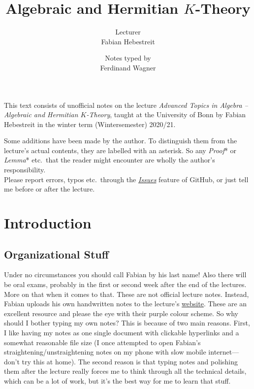 \documentclass[a4paper, 10pt, oneside, DIV=9, chapterprefix=true, numbers=enddot,bibliography=totoc]{scrbook}
\title{Algebraic and Hermitian $K$-Theory}
\author{{\normalsize Lecturer}\\
	Fabian Hebestreit}
\date{{\normalsize Notes typed by}\\
	Ferdinand Wagner}
\begin{document}
	\frontmatter
	\renewcommand{\thedummy}{\arabic{dummy}}
	\maketitle
	\noindent This text consists of unofficial notes on the lecture \emph{Advanced Topics in Algebra -- Algebraic and Hermitian $K$-Theory}, taught at the University of
	Bonn by Fabian Hebestreit in the winter term (Wintersemester) 2020/21.
	
	Some additions have been made by the author. To distinguish them from the lecture's actual contents, they are labelled with an asterisk. So any \emph{Proof}* or \emph{Lemma}* etc.\ that the reader might encounter are wholly the author's responsibility.
	\\[\thmsep]Please report errors, typos etc.\ through the \href{https://github.com/FlorianAdler/AlgebraBonn/issues/new}{\emph{Issues}} feature of GitHub, or just tell me before or after the lecture.
	
	
	\tableofcontents
	\setcounter{llecture}{-1}
	\mainmatter{}
	\renewcommand{\thedummy}{\thechapter.\arabic{dummy}}
	\setcounter{chapter}{-1}
	\renewcommand{\thechapter}{\arabic{chapter}}
	\chapter{Introduction}
	\section{Organizational Stuff}
	Under no circumstances you should call Fabian by his last name! Also there will be oral exams, probably in the first or second week after the end of the lectures. More on that when it comes to that.
	These are not official lecture notes. Instead, Fabian uploads his own handwritten notes to the lecture's \href{https://www.math.uni-bonn.de/people/fhebestr/Ktheory/}{website}. These are an excellent resource and please the eye with their purple colour scheme. So why should I bother typing my own notes? This is because of two main reasons. First, I like having my notes as one single document with clickable hyperlinks and a somewhat reasonable file size (I once attempted to open Fabian's straightening/unstraightening notes on my phone with slow mobile internet---don't try this at home).  The second reason is that typing notes and polishing them after the lecture really forces me to think through all the technical details, which can be a lot of work, but it's the best way for me to learn that stuff.
	
\end{document}
